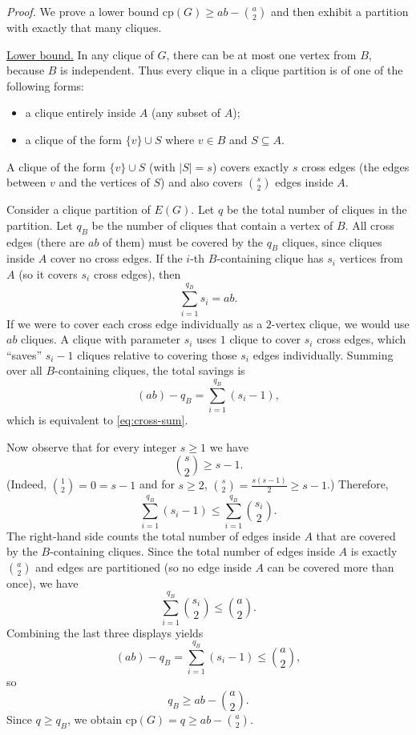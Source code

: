 \emph{Proof.}
We prove a lower bound $\mathrm{cp}(G)\ge ab-\binom{a}{2}$ and then exhibit a partition with exactly that many cliques.

\underline{Lower bound.}
In any clique of $G$, there can be at most one vertex from $B$, because $B$ is independent.
Thus every clique in a clique partition is of one of the following forms:
\begin{itemize}
\item a clique entirely inside $A$ (any subset of $A$);
\item a clique of the form $\{v\}\cup S$ where $v\in B$ and $S\subseteq A$.
\end{itemize}
A clique of the form $\{v\}\cup S$ (with $|S|=s$) covers exactly $s$ cross edges (the edges between $v$ and the vertices of $S$) and also covers $\binom{s}{2}$ edges inside $A$.

Consider a clique partition of $E(G)$.
Let $q$ be the total number of cliques in the partition.
Let $q_B$ be the number of cliques that contain a vertex of $B$.
All cross edges (there are $ab$ of them) must be covered by the $q_B$ cliques, since cliques inside $A$ cover no cross edges.
If the $i$-th $B$-containing clique has $s_i$ vertices from $A$ (so it covers $s_i$ cross edges), then
\begin{equation}\label{eq:cross-sum}
\sum_{i=1}^{q_B} s_i = ab.
\end{equation}
If we were to cover each cross edge individually as a $2$-vertex clique, we would use $ab$ cliques.
A clique with parameter $s_i$ uses $1$ clique to cover $s_i$ cross edges, which ``saves'' $s_i-1$ cliques relative to covering those $s_i$ edges individually.
Summing over all $B$-containing cliques, the total savings is
\[
(ab) - q_B = \sum_{i=1}^{q_B} (s_i-1),
\]
which is equivalent to \eqref{eq:cross-sum}.

Now observe that for every integer $s\ge 1$ we have
\[
\binom{s}{2}\ge s-1.
\]
(Indeed, $\binom{1}{2}=0=s-1$ and for $s\ge 2$, $\binom{s}{2}=\frac{s(s-1)}{2}\ge s-1$.)
Therefore,
\[
\sum_{i=1}^{q_B} (s_i-1) \le \sum_{i=1}^{q_B} \binom{s_i}{2}.
\]
The right-hand side counts the total number of edges inside $A$ that are covered by the $B$-containing cliques. Since the total number of edges inside $A$ is exactly $\binom{a}{2}$ and edges are partitioned (so no edge inside $A$ can be covered more than once), we have
\[
\sum_{i=1}^{q_B} \binom{s_i}{2} \le \binom{a}{2}.
\]
Combining the last three displays yields
\[
(ab)-q_B = \sum_{i=1}^{q_B} (s_i-1) \le \binom{a}{2},
\]
so
\[
q_B \ge ab-\binom{a}{2}.
\]
Since $q\ge q_B$, we obtain $\mathrm{cp}(G)=q\ge ab-\binom{a}{2}$.

